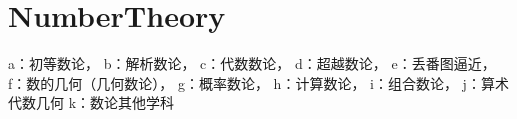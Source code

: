 

\chapter{NumberTheory}


a：初等数论，
b：解析数论，
c：代数数论，
d：超越数论，
e：丢番图逼近，
f：数的几何（几何数论），
g：概率数论，
h：计算数论，
i：组合数论，
j：算术代数几何
k：数论其他学科
